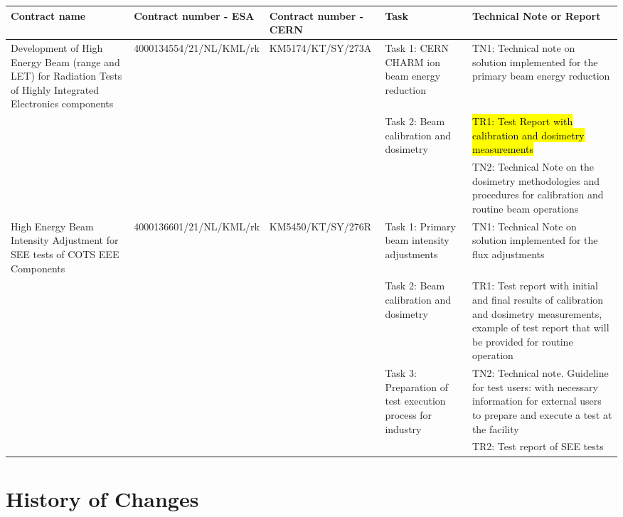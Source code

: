 \documentclass{cernatsnote}
\begin{document}
\begin{table}[!htp]
\centering
{\tiny
\begin{tabular}{@{}p{2.5cm}p{2cm}p{2cm}p{2.4cm}p{5cm}@{}}
\toprule
Contract name & Contract number - ESA & Contract number - CERN & Task & Technical Note or Report \\
\midrule
Development of High Energy Beam (range and LET) for Radiation Tests of Highly Integrated Electronics components &
4000134554\linebreak/21/NL/KML/rk &
KM5174\linebreak/KT/SY/273A &
Task 1: CERN CHARM ion beam energy reduction &
TN1: Technical note on solution implemented for the primary beam energy reduction\\
&  &  & Task 2: Beam calibration and dosimetry & \hl{TR1: Test Report with calibration and dosimetry measurements}\\
 &  &  &  & TN2: Technical Note on the dosimetry methodologies and procedures for calibration and routine beam operations\\
High Energy Beam Intensity Adjustment for SEE tests of COTS EEE Components & 4000136601\linebreak/21/NL/KML/rk & KM5450\linebreak/KT/SY/276R & Task 1: Primary beam intensity adjustments & TN1: Technical Note on solution implemented for the flux adjustments\\
 &  &  & Task 2: Beam calibration and dosimetry & TR1: Test report with initial and final results of calibration and dosimetry measurements, example of test report that will be provided for routine operation\\
 &  &  & Task 3: Preparation of test execution process for industry & TN2: Technical note. Guideline for test users: with necessary information for external users to prepare and execute a test at the facility\\
 &  &  &  & TR2: Test report of SEE tests\\
 \bottomrule
\end{tabular}
}
\end{table}

\newpage

\begingroup
\color{black}
\tableofcontents
\endgroup

\pagebreak

\section{History of Changes}
\end{document}
